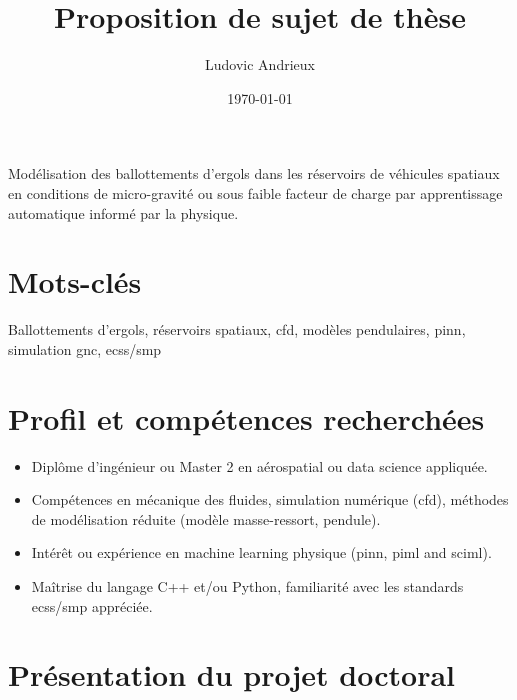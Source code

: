 \documentclass[12pt]{article}
\title{Proposition de sujet de thèse}
\author{Ludovic Andrieux}
\date{\today}
\begin{document}
	\maketitle
	
	\begin{tcolorbox}[colback=gray!0, colframe=black, sharp corners, boxrule=0.5pt]
	Modélisation des ballottements d’ergols dans les réservoirs de véhicules spatiaux en conditions de micro-gravité ou sous faible facteur de charge par apprentissage automatique informé par la physique.
	\end{tcolorbox}
	
	\section*{Mots-clés}
	
	Ballottements d'ergols, réservoirs spatiaux, \acrshort{cfd}, modèles pendulaires, \acrshort{pinn}, simulation \acrshort{gnc}, \acrshort{ecss}/\acrshort{smp}
	
	\section*{Profil et compétences recherchées}
	
	\begin{itemize}
		\item Diplôme d’ingénieur ou Master 2 en aérospatial ou data science appliquée.
		
		\item Compétences en mécanique des fluides, simulation numérique (\acrshort{cfd}), méthodes de modélisation réduite (modèle masse-ressort, pendule).
		
		\item Intérêt ou expérience en machine learning physique (\acrshort{pinn}, \acrshort{piml} and \acrshort{sciml}).
		
		\item Maîtrise du langage C++ et/ou Python, familiarité avec les standards \acrshort{ecss}/\acrshort{smp} appréciée.
	\end{itemize}
	
	
	\section*{Présentation du projet doctoral}
	
\end{document}
